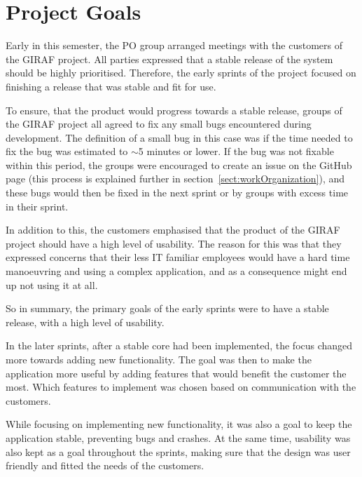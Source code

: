 \section{Project Goals} %
\label{sect:projectGoals}
Early in this semester, the PO group arranged meetings with the customers of the GIRAF project. All parties expressed that a stable release of the system should be highly prioritised. Therefore, the early sprints of the project focused on finishing a release that was stable and fit for use.

To ensure, that the product would progress towards a stable release, groups of the GIRAF project all agreed to fix any small bugs encountered during development. The definition of a small bug in this case was if the time needed to fix the bug was estimated to $\sim$5 minutes or lower. If the bug was not fixable within this period, the groups were encouraged to create an issue on the GitHub page (this process is explained further in section~\ref{sect:workOrganization}), and these bugs would then be fixed in the next sprint or by groups with excess time in their sprint.

In addition to this, the customers emphasised that the product of the GIRAF project should have a high level of usability. The reason for this was that they expressed concerns that their less IT familiar employees would have a hard time manoeuvring and using a complex application, and as a consequence might end up not using it at all.

So in summary, the primary goals of the early sprints were to have a stable release, with a high level of usability.

In the later sprints, after a stable core had been implemented, the focus changed more towards adding new functionality. 
The goal was then to make the application more useful by adding features that would benefit the customer the most. Which features to implement was chosen based on communication with the customers.

While focusing on implementing new functionality, it was also a goal to keep the application stable, preventing bugs and crashes. At the same time, usability was also kept as a goal throughout the sprints, making sure that the design was user friendly and fitted the needs of the customers.
